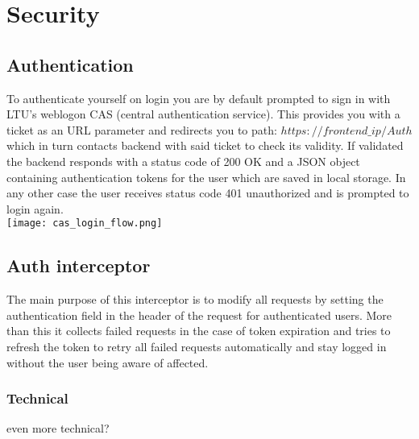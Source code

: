 \section{Security}
\subsection{Authentication}
To authenticate yourself on login you are by default prompted to sign in with LTU's weblogon CAS (central authentication service). 
This provides you with a ticket as an URL parameter and redirects you to path: $https://frontend\_ip/Auth$ which in turn contacts backend with said ticket to check its validity. If validated the backend responds with a status code of 200 OK and a JSON object containing authentication tokens for the user which are saved in local storage. In any other case the user receives status code 401 unauthorized and is prompted to login again.
\\
\texttt{[image: cas\_login\_flow.png]}

\subsection{Auth interceptor}
The main purpose of this interceptor is to modify all requests by setting the authentication field in the header of the request for authenticated users. More than this it collects failed requests in the case of token expiration and tries to refresh the token to retry all failed requests automatically and stay logged in without the user being aware of affected.

\subsubsection{Technical}
even more technical?